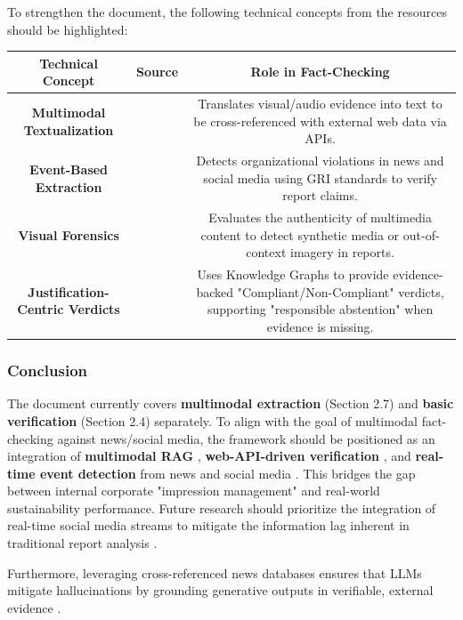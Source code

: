 \documentclass{article}
\begin{document}
To strengthen the document, the following technical concepts from the resources should be highlighted:
\begin{table}[h!]
\centering
\begin{tabular}{|c|c|c|}
\hline
Technical Concept & Source & Role in Fact-Checking \\ \hline
\textbf{Multimodal Textualization} &  \parencite{kazuya_kakizaki_4193ad80} & Translates visual/audio evidence into text to be cross-referenced with external web data via APIs. \\ \hline
\textbf{Event-Based Extraction} &  \parencite{abir_naskar_17efeb7b} & Detects organizational violations in news and social media using GRI standards to verify report claims. \\ \hline
\textbf{Visual Forensics} &  \parencite{vinh_nguyen_phan_020d3d5e} & Evaluates the authenticity of multimedia content to detect synthetic media or out-of-context imagery in reports. \\ \hline
\textbf{Justification-Centric Verdicts} &  \parencite{kaoukis__georgios_35bab107} & Uses Knowledge Graphs to provide evidence-backed "Compliant/Non-Compliant" verdicts, supporting "responsible abstention" when evidence is missing. \\ \hline
\end{tabular}
\end{table}
\subsubsection{Conclusion}

The document currently covers \textbf{multimodal extraction} (Section 2.7) and \textbf{basic verification} (Section 2.4) separately. To align with the goal of multimodal fact-checking against news/social media, the framework should be positioned as an integration of \textbf{multimodal RAG}  \parencite{mohammad_mahdavi_619c09a8}, \textbf{web-API-driven verification}  \parencite{kazuya_kakizaki_4193ad80}, and \textbf{real-time event detection} from news and social media  \parencite{abir_naskar_17efeb7b}. This bridges the gap between internal corporate "impression management"  \parencite{bingjie_li_487d69fd} and real-world sustainability performance. Future research should prioritize the integration of real-time social media streams to mitigate the information lag inherent in traditional report analysis  \parencite{muhammad_arslan_de107b9b}. 



Furthermore, leveraging cross-referenced news databases ensures that LLMs mitigate hallucinations by grounding generative outputs in verifiable, external evidence  \parencite{a_g__kan_cfea8596}. 
\end{document}
